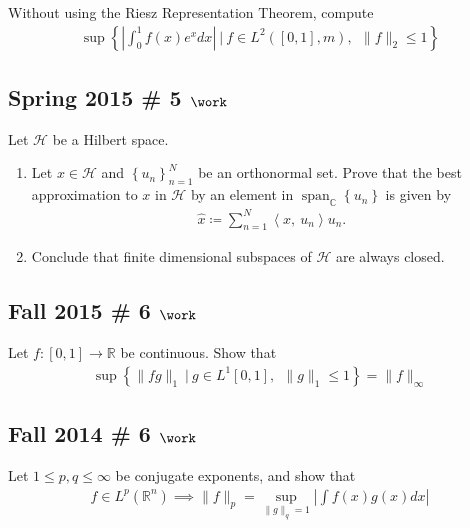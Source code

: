 Without using the Riesz Representation Theorem, compute
\begin{align*}
\sup \left\{\left|\int_{0}^{1} f(x) e^{x} d x\right| {~\mathrel{\Big|}~}f \in L^{2}([0,1], m),~~ \|f\|_{2} \leq 1\right\}
\end{align*}

\hypertarget{spring-2015-5-work}{%
\subsection{\texorpdfstring{Spring 2015 \# 5
\(\work\)}{Spring 2015 \# 5 \textbackslash work}}\label{spring-2015-5-work}}

Let \(\mathcal H\) be a Hilbert space.

\begin{enumerate}
\def\labelenumi{\arabic{enumi}.}
\tightlist
\item
  Let \(x\in \mathcal H\) and \(\left\{{u_n}\right\}_{n=1}^N\) be an
  orthonormal set. Prove that the best approximation to \(x\) in
  \(\mathcal H\) by an element in
  \({\operatorname{span}}_{\mathbb{C}}\left\{{u_n}\right\}\) is given by
  \begin{align*}
    \widehat{x} \coloneqq\sum_{n=1}^N {\left\langle {x},~{u_n} \right\rangle}u_n.
    \end{align*}
\item
  Conclude that finite dimensional subspaces of \(\mathcal H\) are
  always closed.
\end{enumerate}

\hypertarget{fall-2015-6-work}{%
\subsection{\texorpdfstring{Fall 2015 \# 6
\(\work\)}{Fall 2015 \# 6 \textbackslash work}}\label{fall-2015-6-work}}

Let \(f: [0, 1] \to {\mathbb{R}}\) be continuous. Show that
\begin{align*}
\sup \left\{\|f g\|_{1} {~\mathrel{\Big|}~}g \in L^{1}[0,1],~~ \|g\|_{1} \leq 1\right\}=\|f\|_{\infty}
\end{align*}

\hypertarget{fall-2014-6-work}{%
\subsection{\texorpdfstring{Fall 2014 \# 6
\(\work\)}{Fall 2014 \# 6 \textbackslash work}}\label{fall-2014-6-work}}

Let \(1 \leq p,q \leq \infty\) be conjugate exponents, and show that
\begin{align*}
f \in L^p({\mathbb{R}}^n) \implies \|f\|_{p} = \sup _{\|g\|_{q}=1}\left|\int f(x) g(x) d x\right|
\end{align*}

